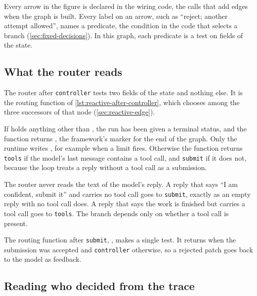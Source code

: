 Every arrow in the figure is declared in the wiring code, the calls that add edges when the graph
is built. Every label on an arrow, such as ``reject; another attempt allowed'', names a predicate,
the condition in the code that selects a branch (\cref{sec:fixed-decisions}). In this graph, each predicate
is a test on fields of the state.

\subsection{What the router reads}
\label{sec:control-reads}

The router after \texttt{controller} tests two fields of the state and nothing else. It is the
routing function  of \cref{lst:reactive-after-controller}, which chooses
among the three successors of that node (\cref{sec:reactive-edge}).

If  holds anything other than , the run has been given a terminal
status, and the function returns , the framework's marker for the end of the graph.
Only the runtime writes , for example when a limit fires. Otherwise the function
returns \texttt{tools} if the model's last message contains a tool call, and \texttt{submit} if it
does not, because the loop treats a reply without a tool call as a submission.

The router never reads the text of the model's reply. A reply that says ``I am confident, submit it'' and carries no tool call goes
to \texttt{submit}, exactly as an empty reply with no tool call does. A reply that says the work is
finished but carries a tool call goes to \texttt{tools}. The branch depends only on whether a tool
call is present.

The routing function after \texttt{submit}, , makes a single test. It
returns  when the submission was accepted and \texttt{controller} otherwise, so a
rejected patch goes back to the model as feedback.

\subsection{Reading who decided from the trace}
\label{sec:control-who}

